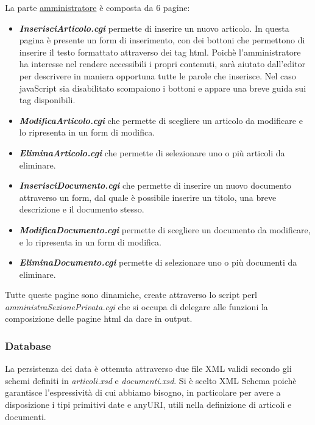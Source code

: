 La parte \underline{amministratore} \`e composta da 6 pagine:
\begin{itemize}
	\item {\bfseries\textit{InserisciArticolo.cgi}} permette di inserire un nuovo articolo. In questa pagina \`e presente un form di inserimento, con dei bottoni che permettono di inserire il testo formattato attraverso dei tag html. Poich\`e l'amministratore ha interesse nel rendere accessibili i propri contenuti, sar\`a aiutato dall'editor per descrivere in maniera opportuna tutte le parole che inserisce. Nel caso javaScript sia disabilitato scompaiono i bottoni e appare una breve guida sui tag disponibili.
	\item {\bfseries\textit{ModificaArticolo.cgi}} che permette di scegliere un articolo da modificare e lo ripresenta in un form di modifica.
	\item {\bfseries\textit{EliminaArticolo.cgi}} che permette di selezionare uno o pi\`u articoli da eliminare.
	\item {\bfseries\textit{InserisciDocumento.cgi}} che permette di inserire un nuovo documento attraverso un form, dal quale \`e possibile inserire un titolo, una breve descrizione e il documento stesso.
	\item {\bfseries\textit{ModificaDocumento.cgi}} permette di scegliere un documento da modificare, e lo ripresenta in un form di modifica.
	\item {\bfseries\textit{EliminaDocumento.cgi}}  permette di selezionare uno o pi\`u documenti da eliminare.
\end{itemize}

	Tutte queste pagine sono dinamiche, create attraverso lo script perl \textit{amministraSezionePrivata.cgi} che si occupa di delegare alle funzioni la composizione delle pagine html da dare in output.
	
\subsubsection{Database}
	La persistenza dei data \`e ottenuta attraverso due file XML validi secondo gli schemi definiti in \textit{articoli.xsd} e \textit{documenti.xsd}. Si \`e scelto XML Schema poich\`e garantisce l'espressivit\`a di cui abbiamo bisogno, in particolare per avere a disposizione i tipi primitivi date e anyURI, utili nella definizione di articoli e documenti.